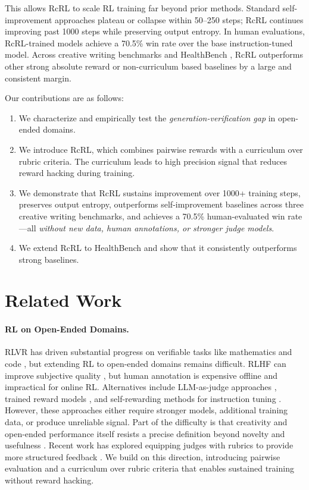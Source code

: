 \documentclass{article}
\theoremstyle{plain}
\theoremstyle{definition}
\theoremstyle{remark}
\begin{document}
This allows RcRL to scale RL training far beyond prior methods. Standard self-improvement approaches plateau or collapse within 50–250 steps; RcRL continues improving past 1000 steps while preserving output entropy. In human evaluations, RcRL-trained models achieve a 70.5\% win rate over the base instruction-tuned model. Across creative writing benchmarks and HealthBench \citep{arora2025healthbench}, RcRL outperforms other strong absolute reward or non-curriculum based baselines by a large and consistent margin.


Our contributions are as follows:
\begin{enumerate}
\item We characterize and empirically test the \emph{generation-verification gap} in open-ended domains.
\item We introduce RcRL, which combines pairwise rewards with a curriculum over rubric criteria. The curriculum leads to high precision signal that reduces reward hacking during training.
\item We demonstrate that RcRL sustains improvement over 1000+ training steps, preserves output entropy, outperforms self-improvement baselines across three creative writing benchmarks, and achieves a 70.5\% human-evaluated win rate—all \emph{without new data, human annotations, or stronger judge models}.
\item We extend RcRL to HealthBench and show that it consistently outperforms strong baselines.
\end{enumerate}


\section{Related Work}
\paragraph{RL on Open-Ended Domains.}
RLVR has driven substantial progress on verifiable tasks like mathematics and code \citep{guo2025deepseek}, but extending RL to open-ended domains remains difficult. RLHF can improve subjective quality \citep{ziegler2020finetuninglanguagemodelshuman, bai2022traininghelpfulharmlessassistant}, but human annotation is expensive offline and impractical for online RL. Alternatives include LLM-as-judge approaches \citep{zheng2023judgingllmasajudgemtbenchchatbot, lee2024rlaifvsrlhfscaling}, trained reward models \citep{fein2025litbenchbenchmarkdatasetreliable, liao2025rlmrreinforcementlearningmixed, wu2025longwriterzeromasteringultralongtext}, and self-rewarding methods for instruction tuning \citep{yuan2025selfrewardinglanguagemodels}. However, these approaches either require stronger models, additional training data, or produce unreliable signal. Part of the difficulty is that creativity and open-ended performance itself resists a precise definition beyond novelty and usefulness \citep{schmidhuber2010formal}. Recent work has explored equipping judges with rubrics to provide more structured feedback \citep{gunjal2025rubricsrewardsreinforcementlearning}. We build on this direction, introducing pairwise evaluation and a curriculum over rubric criteria that enables sustained training without reward hacking.
\end{document}
